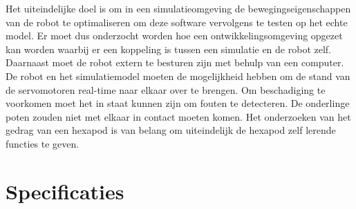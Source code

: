 \documentclass[10pt,a4paper]{article}
\begin{document}
Het uiteindelijke doel is om in een simulatieomgeving de bewegingseigenschappen van de robot te optimaliseren om deze software vervolgens te testen op het echte model. Er moet dus onderzocht worden hoe een ontwikkelingsomgeving opgezet kan worden waarbij er een koppeling is tussen een simulatie en de robot zelf. Daarnaast moet de robot extern te besturen zijn met behulp van een computer. De robot en het simulatiemodel moeten de mogelijkheid hebben om de stand van de servomotoren real-time naar elkaar over te brengen. Om beschadiging te voorkomen moet het in staat kunnen zijn om fouten te detecteren. De onderlinge poten zouden niet met elkaar in contact moeten komen. Het onderzoeken van het gedrag van een hexapod is van belang om uiteindelijk de hexapod zelf lerende functies te geven.
\newpage

\newpage
\section{Specificaties}
\end{document}
